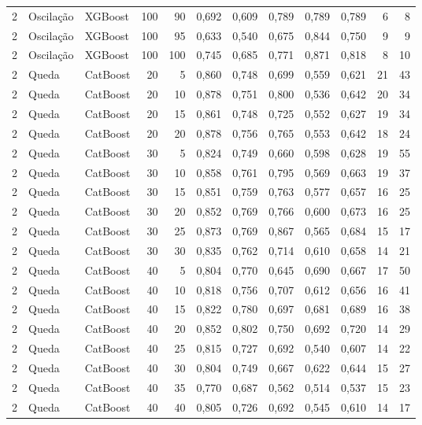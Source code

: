 \begin{longtable}{@{}rllrrrrrrrrr@{}}
2 & Oscilação & XGBoost & 100 & 90 & 0,692 & 0,609 & 0,789 & 0,789 & 0,789 & 6 & 8 \\
2 & Oscilação & XGBoost & 100 & 95 & 0,633 & 0,540 & 0,675 & 0,844 & 0,750 & 9 & 9 \\
2 & Oscilação & XGBoost & 100 & 100 & 0,745 & 0,685 & 0,771 & 0,871 & 0,818 & 8 & 10 \\
2 & Queda & CatBoost & 20 & 5 & 0,860 & 0,748 & 0,699 & 0,559 & 0,621 & 21 & 43 \\
2 & Queda & CatBoost & 20 & 10 & 0,878 & 0,751 & 0,800 & 0,536 & 0,642 & 20 & 34 \\
2 & Queda & CatBoost & 20 & 15 & 0,861 & 0,748 & 0,725 & 0,552 & 0,627 & 19 & 34 \\
2 & Queda & CatBoost & 20 & 20 & 0,878 & 0,756 & 0,765 & 0,553 & 0,642 & 18 & 24 \\
2 & Queda & CatBoost & 30 & 5 & 0,824 & 0,749 & 0,660 & 0,598 & 0,628 & 19 & 55 \\
2 & Queda & CatBoost & 30 & 10 & 0,858 & 0,761 & 0,795 & 0,569 & 0,663 & 19 & 37 \\
2 & Queda & CatBoost & 30 & 15 & 0,851 & 0,759 & 0,763 & 0,577 & 0,657 & 16 & 25 \\
2 & Queda & CatBoost & 30 & 20 & 0,852 & 0,769 & 0,766 & 0,600 & 0,673 & 16 & 25 \\
2 & Queda & CatBoost & 30 & 25 & 0,873 & 0,769 & 0,867 & 0,565 & 0,684 & 15 & 17 \\
2 & Queda & CatBoost & 30 & 30 & 0,835 & 0,762 & 0,714 & 0,610 & 0,658 & 14 & 21 \\
2 & Queda & CatBoost & 40 & 5 & 0,804 & 0,770 & 0,645 & 0,690 & 0,667 & 17 & 50 \\
2 & Queda & CatBoost & 40 & 10 & 0,818 & 0,756 & 0,707 & 0,612 & 0,656 & 16 & 41 \\
2 & Queda & CatBoost & 40 & 15 & 0,822 & 0,780 & 0,697 & 0,681 & 0,689 & 16 & 38 \\
2 & Queda & CatBoost & 40 & 20 & 0,852 & 0,802 & 0,750 & 0,692 & 0,720 & 14 & 29 \\
2 & Queda & CatBoost & 40 & 25 & 0,815 & 0,727 & 0,692 & 0,540 & 0,607 & 14 & 22 \\
2 & Queda & CatBoost & 40 & 30 & 0,804 & 0,749 & 0,667 & 0,622 & 0,644 & 15 & 27 \\
2 & Queda & CatBoost & 40 & 35 & 0,770 & 0,687 & 0,562 & 0,514 & 0,537 & 15 & 23 \\
2 & Queda & CatBoost & 40 & 40 & 0,805 & 0,726 & 0,692 & 0,545 & 0,610 & 14 & 17 \\

\end{longtable}
